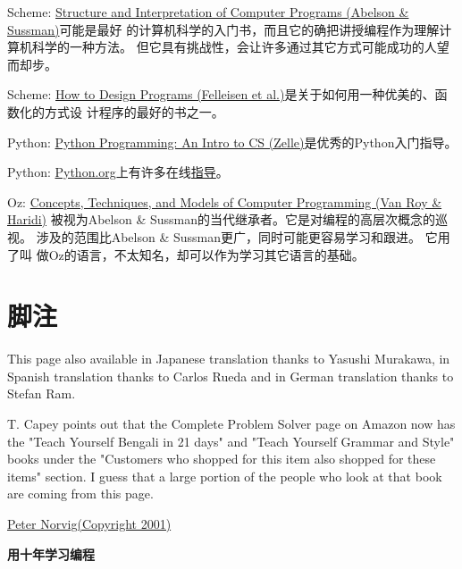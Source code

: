 \begin{compactitem}
\item Scheme: \href{http://www.amazon.com/gp/product/0262011530}{Structure and Interpretation of Computer Programs (Abelson \& Sussman)}可能是最好 的计算机科学的入门书，而且它的确把讲授编程作为理解计算机科学的一种方法。 但它具有挑战性，会让许多通过其它方式可能成功的人望而却步。
\item Scheme: \href{http://www.amazon.com/gp/product/0262062186}{How to Design Programs (Felleisen et al.)}是关于如何用一种优美的、函数化的方式设 计程序的最好的书之一。
\item Python: \href{http://www.amazon.com/gp/product/1887902996}{Python Programming: An Intro to CS (Zelle)}是优秀的Python入门指导。
\item Python: \href{http://python.org/}{Python.org}上有许多在线\href{http://wiki.python.org/moin/BeginnersGuide}{指导}。
\item Oz: \href{http://www.amazon.com/gp/product/0262220695}{Concepts, Techniques, and Models of Computer Programming (Van Roy \& Haridi)} 被视为Abelson \& Sussman的当代继承者。它是对编程的高层次概念的巡视。 涉及的范围比Abelson \& Sussman更广，同时可能更容易学习和跟进。 它用了叫 做Oz的语言，不太知名，却可以作为学习其它语言的基础。
\end{compactitem}

\section{脚注}

This page also available in Japanese translation thanks to Yasushi Murakawa, in Spanish translation thanks to Carlos Rueda and in German translation thanks to Stefan Ram.

T. Capey points out that the Complete Problem Solver page on Amazon now has the "Teach Yourself Bengali in 21 days" and "Teach Yourself Grammar and Style" books under the "Customers who shopped for this item also shopped for these items" section. I guess that a large portion of the people who look at that book are coming from this page.

\begin{flushright}
\href{http://www.norvig.com/index.html}{Peter Norvig(Copyright 2001)}
\end{flushright}


\vspace{20pt}

\begin{center}\textbf{用十年学习编程}\end{center}
	

